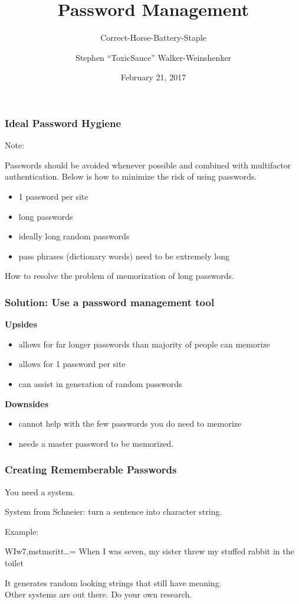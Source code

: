 \documentclass{beamer}
\title{Password Management}
\subtitle{Correct-Horse-Battery-Staple}
\author{Stephen ``ToxicSauce'' Walker-Weinshenker}
\institute{
  \inst{}
  Department of Computer Science\\
  Colorado State University
  \and
  \inst{}
  Department of Electrical and Computer Engineering\\
  Colorado State University
}
\date{February 21, 2017}
\begin{document}
\frame{\titlepage}


\begin{frame}
  \frametitle{Ideal Password Hygiene}
  \begin{block}{Note:}

    Passwords should be avoided whenever possible and combined with multifactor
    authentication. Below is how to minimize the risk of using passwords.

  \end{block}
\begin{itemize}
  \item 1 password per site
  \item long passwords
  \item ideally long random passwords
  \item pass phrases (dictionary words) need to be extremely long
\end{itemize}
How to resolve the problem of memorization of long passwords.
\end{frame}

\begin{frame}
  \frametitle{Solution: Use a password management tool}
  \textbf{Upsides}
\begin{itemize}
  \item allows for far longer passwords than majority of people can memorize
  \item allows for 1 password per site
  \item can assist in generation of random passwords
\end{itemize}
\textbf{Downsides}
\begin{itemize}
  \item cannot help with the few passwords you do need to memorize
  \item needs a master password to be memorized.
\end{itemize}
\end{frame}

\begin{frame}
  \frametitle{Creating Rememberable Passwords}
  You need a system.

  System from Schneier: turn a sentence into character string.
  \begin{exampleblock}{Example:}

    WIw7,mstmsritt\ldots = When I was seven, my sister threw my stuffed rabbit
    in the toilet

  \end{exampleblock}

  It generates random looking strings that still have meaning.\\
  \vspace{8pt}
  Other systems are out there. Do your own research.

\end{frame}
\end{document}
